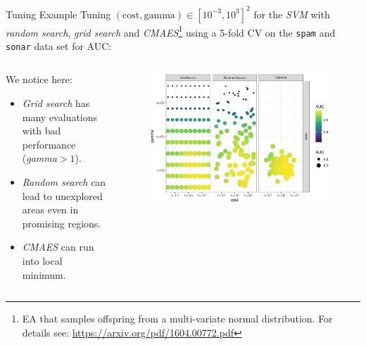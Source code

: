 \begin{frame}{Tuning Example}
Tuning $(\text{cost},\text{gamma}) \in [10^{-3},10^{3}]^2$ for the \emph{SVM} with \emph{random search}, \emph{grid search} and \emph{CMAES}\footnote{EA that samples offspring from a multi-variate normal distribution. For details see: \url{https://arxiv.org/pdf/1604.00772.pdf}} using a 5-fold CV on the \texttt{spam} and \texttt{sonar} data set for AUC:
\begin{columns}
\begin{column}{0.45\textwidth}
  \vspace{1em}

  We notice here:
  
  \begin{itemize}
    \item \emph{Grid search} has many evaluations with bad performance (\emph{gamma}$>1$).
    \item \emph{Random search} can lead to unexplored areas even in promising regions. 
    \item \emph{CMAES} can run into local minimum.
  \end{itemize}
\end{column}%
\begin{column}{0.6\textwidth}
  \vspace{-1em}
  \begin{figure}
  \includegraphics[width=\textwidth]{images/benchmark_scatter.png}
  \end{figure}
\end{column}
\end{columns}
\end{frame}

